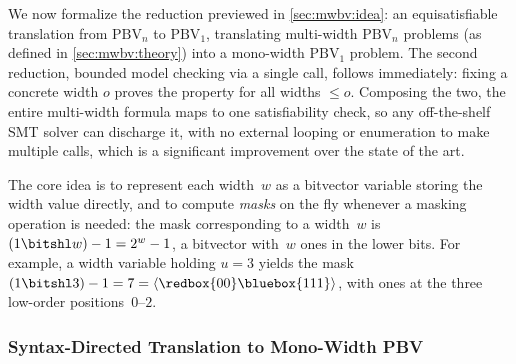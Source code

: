 We now formalize the reduction previewed in \cref{sec:mwbv:idea}:
an equisatisfiable translation from $\text{PBV}_n$ to $\text{PBV}_1$,
translating multi-width $\text{PBV}_n$ problems (as defined in \cref{sec:mwbv:theory})
into a mono-width $\text{PBV}_1$ problem.
The second reduction, bounded model checking via a single \qfbv{} call, follows immediately: fixing a concrete width $o$ proves
the property for all widths $\leq o$.
Composing the two, the entire multi-width formula maps to
one \qfbv{} satisfiability check, so any off-the-shelf SMT solver can discharge it,
with no external looping or enumeration to make multiple \qfbv{} calls, which is a significant improvement over the state of the art.

The core idea is to represent each width~$w$ as a bitvector variable storing the
width value directly, and to compute \emph{masks} on the fly whenever a
masking operation is needed:
the mask corresponding to a width~$w$ is $(1 \bitshl w) - 1 = 2^{w} - 1$, a
bitvector with~$w$ ones in the lower bits.
%
For example, a width variable holding $u = 3$ yields the mask
$(1 \bitshl 3) - 1 = 7 = \langle \redbox{00}\bluebox{111} \rangle$,
with ones at the three low-order positions~$0$--$2$.

\subsubsection{Syntax-Directed Translation to Mono-Width PBV}

